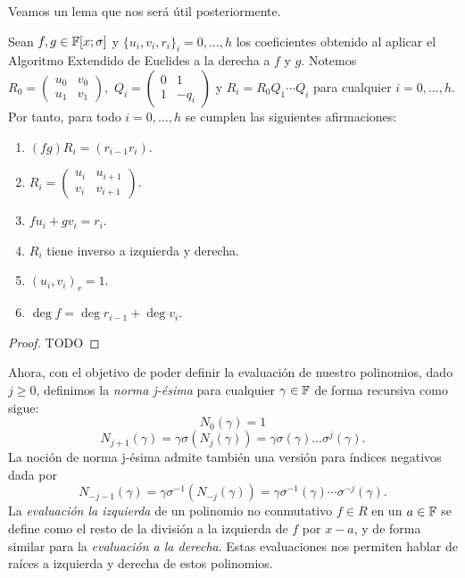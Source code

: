 Veamos un lema que nos será útil posteriormente.

\begin{lemma}
\label{lem:reea}
    Sean \(f, g \in \mathbb{F}[x; \sigma] \) y \(  {\{u_{i}, v_{i}, r_{i}\}}_i = 0, \ldots, h\) los coeficientes obtenido al aplicar el Algoritmo Extendido de Euclides a la derecha a \(f\) y \(g\). Notemos \(R_{0} =
    \begin{pmatrix}
    u_0 & v_0 \\
    u_1 & v_1
    \end{pmatrix},\)
    \(Q_i =
    \begin{pmatrix}
        0 & 1 \\
        1 & -q_i
    \end{pmatrix}
    \)
    y \(R_i =  R_0 Q_1 \cdots Q_i\) para cualquier \(i = 0, \ldots, h\). Por tanto, para todo \(i = 0, \ldots, h\) se cumplen las siguientes afirmaciones:

    \begin{enumerate}[label=\roman*)]
        \item \((fg)R_i = (r_{i-1} r_i)\).
        \item \(R_i =
            \begin{pmatrix}
            u_i & u_{i+1} \\
            v_{i} & v_{i+1}
            \end{pmatrix}\).
        \item \(f u_i + g v_i = r_i\).
        \item \(R_i\) tiene inverso a izquierda y derecha.
        \item \((u_i, v_i)_r = 1\).
        \item \(\deg f = \deg r_{i-1} + \deg v_{i}\).

    \end{enumerate}
\end{lemma}
\begin{proof}
    TODO
\end{proof}

Ahora, con el objetivo de poder definir la evaluación de nuestro polinomios, dado \(j \geq 0\), definimos la \textit{norma j-ésima} para cualquier \(\gamma \in \mathbb{F}\) de forma recursiva como sigue:
\[
N_0(\gamma) = 1
\]
\[
N_{j+1}(\gamma) = \gamma \sigma(N_{j}(\gamma)) = \gamma \sigma(\gamma)\dots\sigma^{j}(\gamma)
.\]
La noción de norma j-ésima admite también una versión para índices negativos dada por
\[
N_{-j-1}(\gamma) = \gamma \sigma^{-1}(N_{-j}(\gamma)) =  \gamma \sigma^{-1}(\gamma) \cdots \sigma^{-j}(\gamma)
.\]
La \textit{evaluación la izquierda} de un polinomio no conmutativo \(f \in R\) en un \(a \in \mathbb{F}\) se define como el resto de la división a la izquierda de \(f\) por  \(x - a\), y de forma similar para la  \textit{evaluación a la derecha}. Estas evaluaciones nos permiten hablar de raíces a izquierda y derecha de estos polinomios.

